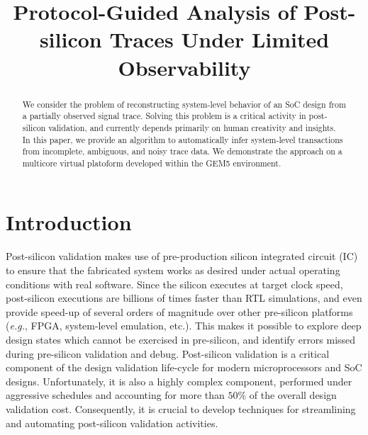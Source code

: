\documentclass[conference]{IEEEtran}
\title{\Large {\bf Protocol-Guided Analysis of Post-silicon
  Traces Under Limited Observability}}
\newcommand{\eg}{\mbox{{\em e.g.}}}
\begin{document}
\maketitle

\begin{abstract}
We consider the problem of reconstructing system-level
behavior of an SoC design from a partially observed signal
trace.  Solving this problem is a critical activity in
post-silicon validation, and currently depends primarily on
human creativity and insights.  In this paper, we provide an
algorithm to automatically infer system-level transactions
from incomplete, ambiguous, and noisy trace data.  We
demonstrate the approach on a multicore virtual platoform
developed within the GEM5 environment.
\end{abstract}

\section{Introduction}

Post-silicon validation makes use of pre-production silicon
integrated circuit (IC) to ensure that the fabricated system
works as desired under actual operating conditions with real
software.  Since the silicon executes at target clock speed,
post-silicon executions are billions of times faster than
RTL simulations, and even provide speed-up of several orders
of magnitude over other pre-silicon platforms (\eg, FPGA,
system-level emulation, etc.).  This makes it possible to
explore deep design states which cannot be exercised in
pre-silicon, and identify errors missed during pre-silicon
validation and debug.  Post-silicon validation is a critical
component of the design validation life-cycle for modern
microprocessors and SoC designs.  Unfortunately, it is also
a highly complex component, performed under aggressive
schedules and accounting for more than $50\%$ of the overall
design validation cost.  Consequently, it is crucial to
develop techniques for streamlining and automating
post-silicon validation activities.
\end{document}
